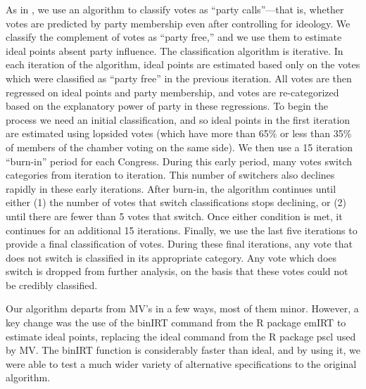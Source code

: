 \documentclass[12pt]{article}
\begin{document}
As in \cite{Minozzi:2013}, we use an algorithm to classify votes as ``party calls''---that is, whether votes are predicted by party membership even after controlling for ideology.  We classify the complement of votes as ``party free,'' and we use them to estimate ideal points absent party influence.  The classification algorithm is iterative.  In each iteration of the algorithm, ideal points are estimated based only on the votes which were classified as ``party free'' in the previous iteration.  All votes are then regressed on ideal points and party membership, and votes are re-categorized based on the explanatory power of party in these regressions.  To begin the process we need an initial classification, and so ideal points in the first iteration are estimated using lopsided votes (which have more than 65\% or less than 35\% of members of the chamber voting on the same side).  We then use a 15 iteration ``burn-in'' period for each Congress.  During this early period, many votes switch categories from iteration to iteration.  This number of switchers also declines rapidly in these early iterations.  After burn-in, the algorithm continues until either (1) the number of votes that switch classifications stops declining, or (2) until there are fewer than 5 votes that switch.  Once either condition is met, it continues for an additional 15 iterations.  Finally, we use the last five iterations to provide a final classification of votes. During these final iterations, any vote that does not switch is classified in its appropriate category.  Any vote which does switch is dropped from further analysis, on the basis that these votes could not be credibly classified.

Our algorithm departs from MV's in a few ways, most of them minor.  However, a key change was the use of the \textsf{binIRT} command from the \textsf{R} package \textsf{emIRT} \citep{Imai:2016} to estimate ideal points, replacing the \textsf{ideal} command from the \textsf{R} package \textsf{pscl} \citep{Jackman:2015} used by MV.  The \textsf{binIRT} function is considerably faster than \textsf{ideal}, and by using it, we were able to test a much wider variety of alternative specifications to the original algorithm.
\end{document}
